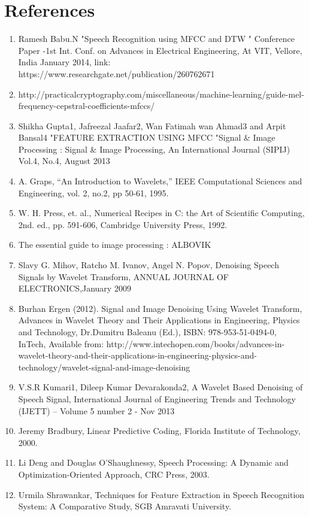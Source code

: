 \documentclass[12pt, a4paper, twoside]{report}
\begin{document}
\section*{References}
\begin{enumerate}
\item Ramesh    Babu.N "Speech Recognition using MFCC and DTW " Conference    Paper -1st Int. Conf. on Advances in Electrical Engineering, At VIT, Vellore, India January 2014, link: https://www.researchgate.net/publication/260762671
\item http://practicalcryptography.com/miscellaneous/machine-learning/guide-mel-frequency-cepstral-coefficients-mfccs/
\item Shikha Gupta1, Jafreezal Jaafar2, Wan Fatimah wan Ahmad3  and Arpit Bansal4 "FEATURE EXTRACTION USING MFCC "Signal \& Image Processing : Signal \& Image Processing, An International Journal (SIPIJ) Vol.4, No.4, August 2013
\item A. Graps, “An Introduction to Wavelets,” IEEE Computational Sciences and Engineering, vol. 2, no.2, pp 50-61, 1995.
\item W. H. Press, et. al., Numerical Recipes in C: the Art of Scientific Computing, 2nd. ed., pp. 591-606, Cambridge University Press, 1992.
\item The essential guide to image processing : ALBOVIK
\item Slavy G. Mihov, Ratcho M. Ivanov, Angel N. Popov, Denoising Speech Signals by Wavelet Transform, ANNUAL JOURNAL OF ELECTRONICS,January 2009
\item Burhan Ergen (2012). Signal and Image Denoising Using Wavelet Transform, Advances in Wavelet Theory and Their Applications in Engineering, Physics and Technology, Dr.Dumitru Baleanu (Ed.), ISBN: 978-953-51-0494-0, InTech, Available from: http://www.intechopen.com/books/advances-in-wavelet-theory-and-their-applications-in-engineering-physics-and-technology/wavelet-signal-and-image-denoising
\item V.S.R Kumari1, Dileep Kumar Devarakonda2, A Wavelet Based Denoising of Speech Signal, International Journal of Engineering Trends and Technology (IJETT) – Volume 5 number 2 - Nov 2013
\item Jeremy Bradbury, Linear Predictive Coding, Florida Institute of Technology, 2000.
\item Li Deng and Douglas O'Shaughnessy, Speech Processing: A Dynamic and Optimization-Oriented Approach, CRC Press, 2003.
\item Urmila Shrawankar, Techniques for Feature Extraction in Speech Recognition System: A Comparative Study, SGB Amravati University.
\end{enumerate}
\end{document}
